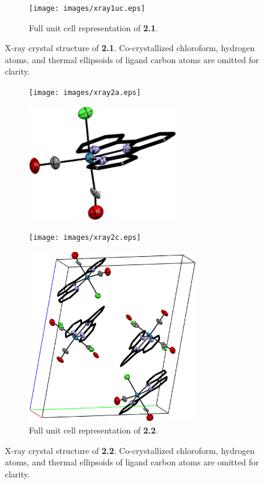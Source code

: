 \begin{figure}[!ht]
\begin{subfigure}[b]{0.49\textwidth}
 \end{subfigure}
 \begin{subfigure}[b]{\textwidth}
  \centering
  \texttt{[image: images/xray1uc.eps]}
  \caption{Full unit cell representation of \textbf{2.1}.}
 \end{subfigure}
\caption[X-ray crystal structure of \textbf{2.1}.]{X-ray crystal structure of \textbf{2.1}. Co-crystallized chloroform, hydrogen atoms, and thermal ellipsoids of ligand carbon atoms are omitted for clarity.}
\label{fig.xray21}
\end{figure}

\begin{figure}[!ht]
 \centering
 \begin{subfigure}[b]{0.49\textwidth}
  \texttt{[image: images/xray2a.eps]}
 \end{subfigure}
 \begin{subfigure}[b]{0.49\textwidth}
  \includegraphics[clip=true, width=\textwidth, height=50mm, keepaspectratio]{images/xray2b.eps}
 \end{subfigure}
 \begin{subfigure}[b]{0.49\textwidth}
  \texttt{[image: images/xray2c.eps]}
 \end{subfigure}
 \begin{subfigure}[b]{\textwidth}
  \centering
  \includegraphics[clip=true, width=\textwidth, height=75mm, keepaspectratio]{images/xray2uc.eps}
  \caption{Full unit cell representation of \textbf{2.2}.}
 \end{subfigure}
\caption[X-ray crystal structure of \textbf{2.2}.]{X-ray crystal structure of \textbf{2.2}. Co-crystallized chloroform, hydrogen atoms, and thermal ellipsoids of ligand carbon atoms are omitted for clarity.}
\label{fig.xray22}
\end{figure}

